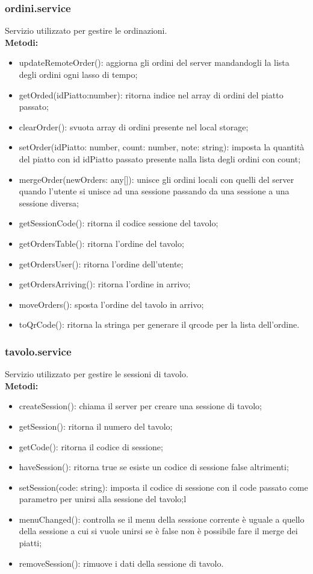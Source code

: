 \subsubsection{ordini.service}
Servizio utilizzato per gestire le ordinazioni.\\
\textbf{Metodi:}
\begin{itemize}
    \item updateRemoteOrder(): aggiorna gli ordini del server mandandogli la lista degli ordini ogni lasso di tempo;
    \item getOrded(idPiatto:number): ritorna indice nel array di ordini del piatto passato;
    \item clearOrder(): svuota array di ordini presente nel local storage;
    \item setOrder(idPiatto: number, count: number, note: string): imposta la quantità del piatto  con id idPiatto passato presente nalla lista degli ordini con count;
    \item mergeOrder(newOrders: any[]): unisce gli ordini locali con quelli del server quando l'utente si unisce ad una sessione passando da una sessione a una sessione diversa;
    \item getSessionCode(): ritorna il codice sessione del tavolo;
    \item getOrdersTable(): ritorna l'ordine del tavolo;
    \item getOrdersUser(): ritorna l'ordine dell'utente;
    \item getOrdersArriving(): ritorna l'ordine in arrivo;
    \item moveOrders(): sposta l'ordine del tavolo in arrivo;
    \item toQrCode(): ritorna la stringa per generare il qrcode per la lista dell'ordine.
\end{itemize}

\subsubsection{tavolo.service}
Servizio utilizzato per gestire le sessioni di tavolo.\\
\textbf{Metodi:}
\begin{itemize}
    \item createSession(): chiama il server per creare una sessione di tavolo;
    \item getSession(): ritorna il numero del tavolo;
    \item getCode(): ritorna il codice di sessione;
    \item haveSession(): ritorna true se esiste un codice di sessione false altrimenti;
    \item setSession(code: string): imposta il codice di sessione con il code passato come parametro per unirsi alla sessione del tavolo;l
    \item menuChanged(): controlla se il menu della sessione corrente è uguale a quello della sessione a cui si vuole unirsi se è false non è possibile fare il merge dei piatti;
    \item removeSession(): rimuove i dati della sessione di tavolo.
\end{itemize}


